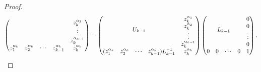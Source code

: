 \documentclass[11pt]{llncs}
\begin{document}
\begin{proof}
\[\begin{pmatrix}
& & & & z_k^{\alpha_2}\\
& & & & \vdots\\
& & & & z_{k}^{\alpha_{k-1}}\\
z_1^{\alpha_{k}} & z_2^{\alpha_{k}}& \cdots & z_{k-1}^{\alpha_{k}} & z_{k}^{\alpha_k}
\end{pmatrix}
= 
\begin{pmatrix}
\multicolumn{4}{c}{\multirow{4}{*}{$U_{k-1}$}} & z_k^{\alpha_1}\\
& & & & z_k^{\alpha_2}\\
& & & & \vdots\\
& & & & z_{k}^{\alpha_{k-1}}\\
(z_1^{\alpha_{k}} & z_2^{\alpha_{k}}& \cdots & z_{k-1}^{\alpha_{k}})L_{k-1}^{-1} & z_{k}^{\alpha_k}
\end{pmatrix}
\begin{pmatrix}
\multicolumn{4}{c}{\multirow{4}{*}{$L_{k-1}$}} & 0\\
& & & & 0\\
& & & & \vdots\\
& & & & 0\\
0 & 0& \cdots & 0 & 1
\end{pmatrix}.
\]
    

\end{proof}
\end{document}
